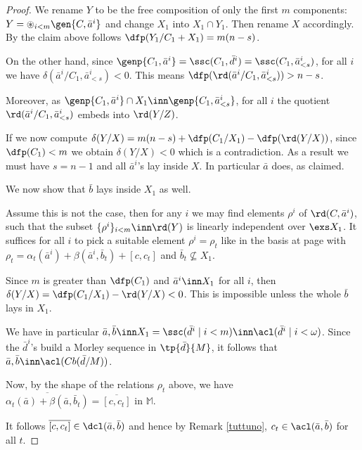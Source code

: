 \begin{proof}
We rename $Y$ to be the free composition of only the first $m$ components: $Y=\circledast_{i<m}\gen{C,\bar a^{i}}$ and
change $X_{1}$ into $X_{1}\cap Y_{1}$. Then rename $X$ accordingly.
By the claim above follows $\dfp(Y_{1}/C_{1}+X_{1})=m(n-s)$.

On the other hand, since $\genp{C_{1},\bar a^{i}}=\ssc(C_{1},\bar %
d^{i})=\ssc(C_{1},\bar a^{i}_{<s})$, for all $i$ we have $\delta(\bar a^{i}/C_{1},\bar a^{i}_{<s})
<0$. This means $\dfp(\rd(\bar a^{i}/C_{1},\bar a^{i}_{<s}))>n-s$.

Moreover, as $\genp{C_{1},\bar a^{i}}\cap X_{1}\inn\genp{C_{1},\bar a^{i}_{<s}}$, for all $i$ the
quotient $\rd(\bar a^{i}/C_{1},\bar a^{i}_{<s})$ embeds into $\rd(Y/Z)$.

If we now compute $\delta(Y/X)=m(n-s)+\dfp(C_{1}/X_{1})-\dfp(\rd(Y/X))$, since $\dfp(C_{1})<m$
we obtain $\delta(Y/X)<0$ which is a contradiction. As a result we must have $s=n-1$ and
all $\bar a^{i}$'s lay inside $X$. In particular $\bar a$ does, as claimed.

\medskip
We now show that $\bar b$ lays inside $X_{1}$ as well.

Assume this is not the case, then for any $i$ we may find elements $\rho^{i}$ of $\rd(C,\bar a^{i})$,
such that the subset $\{\rho^{i}\}_{i<m}\inn\rd(Y)$  is linearly independent over $\exs X_{1}$.
It suffices for all $i$ to pick a suitable element $\rho^{i}=\rho_{t}$ like in the basis  at page \pageref{rhodi} with $\rho_{t}=
\alpha_{t}(\bar a^{i})+\beta(\bar a^{i},\bar b_{t})+[c,c_{t}]$ and $\bar b_{t}\nsubseteq X_{1}$.

Since $m$ is greater than $\dfp(C_{1})$ and %
$\bar a^{i}\inn X_{1}$ for all $i$, then $\delta(Y/X)=\dfp(C_{1}/X_{1})-\rd(Y/X)<0$. This is impossible unless
the whole $\bar b$ lays in $X_{1}$.

\smallskip
We have in particular $\bar a,\bar b\inn X_{1}=\ssc(\bar d^{i}\mid i<m)\inn\acl(\bar d^{i}\mid i<\omega)$. Since the $\bar d^{i}$'s build a Morley
sequence in $\tp{\bar d}{M}$, it follows that $\bar a,\bar b\inn\acl(Cb(\bar d/M))$.

Now, by the shape of the relations $\rho_{t}$ above, we have $\overline{\alpha_{t}(\bar a)+\beta(\bar a,\bar b_{t})}=
\overline{[c,c_{t}]}$ in $\mathbb{M}$.

It follows $\overline{[c,c_{t}]}\in\dcl(\bar a,\bar b)$ and hence by Remark \ref{tuttuno}, $c_{t}\in\acl(\bar a, \bar b)$ for all $t$.


\end{proof}
